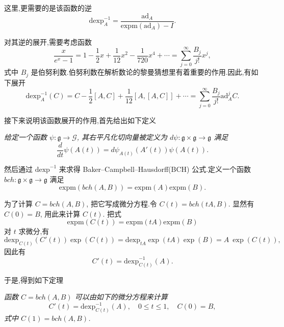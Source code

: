 这里,更需要的是该函数的逆
\begin{equation*}
	\mbox{dexp}_A^{-1}=\frac{\mbox{ad}_A}{\mbox{expm}(\mbox{ad}_A)-I}.
\end{equation*}

对其逆的展开,需要考虑函数
\begin{equation*}
	\frac{x}{e^x-1}=1-\frac{1}{2}x+\frac{1}{12}x^2-\frac{1}{720}x^4+\cdots=\sum_{j=0}^{\infty}\frac{B_j}{j!}x^j,
\end{equation*}
式中 $B_j$ 是伯努利数.伯努利数在解析数论的黎曼猜想里有着重要的作用.因此,有如下展开
\begin{equation*}
	\mbox{dexp}_A^{-1}(C)=C-\frac{1}{2}[A,C]+\frac{1}{12}[A,[A,C]]+\cdots=\sum_{j=0}^{\infty}\frac{B_j}{j!}\mbox{ad}^j_AC.
\end{equation*}

接下来说明该函数展开的作用,首先给出如下定义
\begin{definition}
	\emph{给定一个函数 $\psi:\mathfrak{g}\to\mathcal{G}$, 其右平凡化切向量被定义为 $d\psi:\mathfrak{g} \times \mathfrak{g} \to \mathfrak{g}$ 满足
	\begin{equation*}
		\frac{d}{dt}\psi(A(t))=d\psi_{A(t)}(A'(t))\psi(A(t)).
	\end{equation*}}
\end{definition}

然后通过 $\mbox{dexp}^{-1}$ 来求得 Baker–Campbell–Hausdorff(BCH) 公式.定义一个函数 $bch:\mathfrak{g} \times \mathfrak{g} \to \mathfrak{g}$ 满足
\begin{equation*}
	\mbox{expm}(bch(A,B))=\mbox{expm}(A)\mbox{expm}(B).
\end{equation*}

为了计算 $C=bch(A,B)$, 把它写成微分方程.令 $C(t)=bch(tA,B)$. 显然有 $C(0)=B$, 用此来计算 $C(t)$. 把式
\begin{equation*}
	\mbox{expm}(C(t))=\mbox{expm}(tA)\mbox{expm}(B)
\end{equation*}
对 $t$ 求微分,有
\begin{equation*}
	\mbox{dexp}_{C(t)}(C'(t))\exp(C(t))=\mbox{dexp}_{tA}\exp(tA)\exp(B)=A~\exp(C(t)),
\end{equation*}
因此有
\begin{equation*}
	C'(t)=\mbox{dexp}_{C(t)}^{-1}(A).
\end{equation*}

于是,得到如下定理
\begin{theorem}
	\emph{函数 $C=bch(A,B)$ 可以由如下的微分方程来计算
	\begin{equation*}
		C'(t)=\mbox{dexp}_{C(t)}^{-1}(A),\quad 0\leq t\leq 1,\quad C(0)=B,
	\end{equation*}
	式中 $C(1)=bch(A,B)$.}
\end{theorem}

